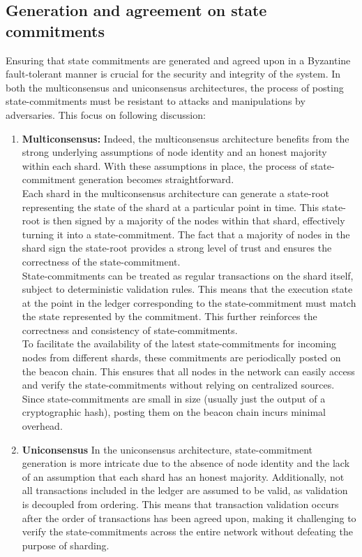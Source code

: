 \documentclass{report}
\begin{document}
\subsection{Generation and agreement on state commitments}
Ensuring that state commitments are generated and agreed upon in a Byzantine fault-tolerant manner is crucial for the security and integrity of the system. In both the multiconsensus and uniconsensus architectures, the process of posting state-commitments must be resistant to attacks and manipulations by adversaries. This focus on following discussion:
\begin{enumerate}
	\item \textbf{Multiconsensus:} Indeed, the multiconsensus architecture benefits from the strong underlying assumptions of node identity and an honest majority within each shard. With these assumptions in place, the process of state-commitment generation becomes straightforward.\\
	Each shard in the multiconsensus architecture can generate a state-root representing the state of the shard at a particular point in time. This state-root is then signed by a majority of the nodes within that shard, effectively turning it into a state-commitment. The fact that a majority of nodes in the shard sign the state-root provides a strong level of trust and ensures the correctness of the state-commitment.\\
	State-commitments can be treated as regular transactions on the shard itself, subject to deterministic validation rules. This means that the execution state at the point in the ledger corresponding to the state-commitment must match the state represented by the commitment. This further reinforces the correctness and consistency of state-commitments.\\
	To facilitate the availability of the latest state-commitments for incoming nodes from different shards, these commitments are periodically posted on the beacon chain. This ensures that all nodes in the network can easily access and verify the state-commitments without relying on centralized sources. Since state-commitments are small in size (usually just the output of a cryptographic hash), posting them on the beacon chain incurs minimal overhead.
	\item \textbf{Uniconsensus} In the uniconsensus architecture, state-commitment generation is more intricate due to the absence of node identity and the lack of an assumption that each shard has an honest majority. Additionally, not all transactions included in the ledger are assumed to be valid, as validation is decoupled from ordering. This means that transaction validation occurs after the order of transactions has been agreed upon, making it challenging to verify the state-commitments across the entire network without defeating the purpose of sharding.\\

\end{enumerate}
\end{document}

